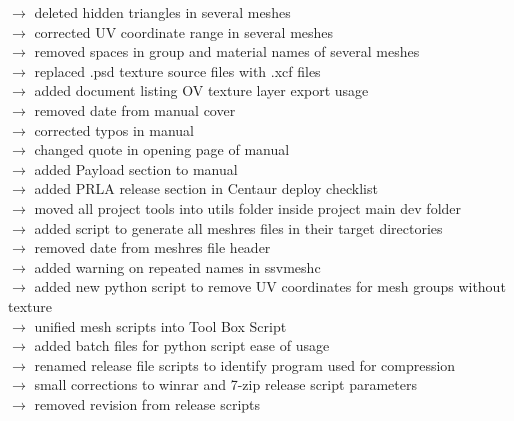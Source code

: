 \documentclass[Space_Shuttle_Vessel_Manual.tex]{subfiles}
\begin{document}
$\rightarrow$ deleted hidden triangles in several meshes\\
$\rightarrow$ corrected UV coordinate range in several meshes\\
$\rightarrow$ removed spaces in group and material names of several meshes\\
$\rightarrow$ replaced .psd texture source files with .xcf files\\
$\rightarrow$ added document listing OV texture layer export usage\\
$\rightarrow$ removed date from manual cover\\
$\rightarrow$ corrected typos in manual\\
$\rightarrow$ changed quote in opening page of manual\\
$\rightarrow$ added Payload section to manual\\
$\rightarrow$ added PRLA release section in Centaur deploy checklist\\
$\rightarrow$ moved all project tools into utils folder inside project main dev folder\\
$\rightarrow$ added script to generate all meshres files in their target directories\\
$\rightarrow$ removed date from meshres file header\\
$\rightarrow$ added warning on repeated names in ssvmeshc\\
$\rightarrow$ added new python script to remove UV coordinates for mesh groups without texture\\
$\rightarrow$ unified mesh scripts into Tool Box Script\\
$\rightarrow$ added batch files for python script ease of usage\\
$\rightarrow$ renamed release file scripts to identify program used for compression\\
$\rightarrow$ small corrections to winrar and 7-zip release script parameters\\
$\rightarrow$ removed revision from release scripts\\
\end{document}
